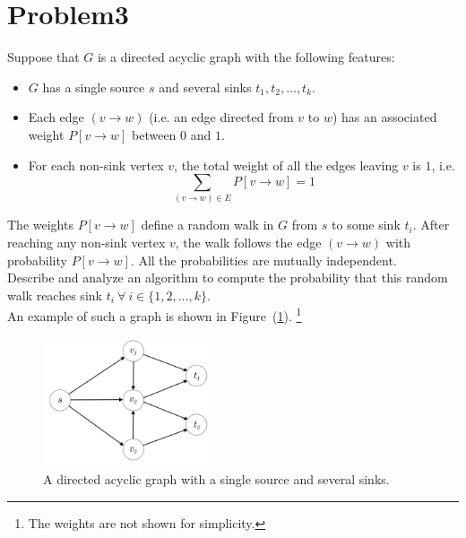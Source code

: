 \documentclass[12pt]{report}
\begin{document}
    \section*{\huge{Problem3}}
    Suppose that $G$ is a directed acyclic graph with the following features:
    \begin{itemize}
        \item $G$ has a single source $s$ and several sinks $t_{1}, t_{2}, \dots, t_{k}$.
        \item Each edge $(v \to w)$ (i.e. an edge directed from $v$ to $w$) has an associated weight $P[v \to w]$ between $0$ and $1$.
        \item For each non-sink vertex $v$, the total weight of all the edges leaving $v$ is $1$, i.e.
        \begin{equation}
            \label{eq:total_weight}
            \sum_{(v \to w) \in E} P[v \to w] = 1
        \end{equation}
    \end{itemize}
    The weights $P[v \to w]$ define a random walk in $G$ from $s$ to some sink $t_{i}$.
    After reaching any non-sink vertex $v$, the walk follows the edge $(v \to w)$ with probability $P[v \to w]$.
    All the probabilities are mutually independent. \\
    Describe and analyze an algorithm to compute the probability that this random walk reaches sink
    $t_{i} \ \forall \ i \in \{ 1, 2, \dots, k \}$. \\
    An example of such a graph is shown in Figure~(\ref{fig:dag}).
    \footnote{The weights are not shown for simplicity.}

    \begin{figure}[htp]
        \begin{center}
            \includegraphics[width=0.45\textwidth]{dag.png}
        \end{center}
        \caption{A directed acyclic graph with a single source and several sinks.}
        \label{fig:dag}
    \end{figure}
\end{document}
